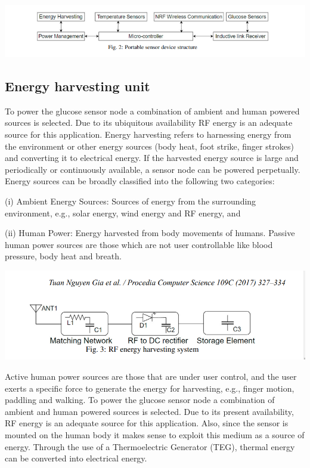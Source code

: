 \documentclass{article}
\begin{document}
\begin{center}
  \includegraphics[scale=0.5]{sensor.png}
  \label{fig:sen}
\end{center}

\subsection{Energy harvesting unit}
To power the glucose sensor node a combination of ambient and human powered sources is selected. Due to its ubiquitous availability RF energy is an adequate source for this application.
Energy harvesting refers to harnessing energy from the environment or other energy sources (body heat, foot strike, finger strokes) and converting it to electrical energy. If the harvested energy source is large and periodically or continuously available, a sensor node can be powered perpetually. Energy sources can be broadly classified into the following two categories:

(i) Ambient Energy Sources: Sources of energy from the surrounding environment, e.g., solar energy, wind energy and RF energy, and 

(ii) Human Power: Energy harvested from body movements of humans. Passive human power sources are those which are not user controllable like blood pressure, body heat and breath. 


\begin{center}
  \includegraphics[scale=0.5]{rf.png}
  \label{fig:rf}
\end{center}

Active human power sources are those that are under user control, and the user exerts a specific force to generate the energy for harvesting, e.g., finger motion, paddling and walking. To power the glucose sensor node a combination of ambient and human powered sources is selected. Due to its present availability, RF energy is an adequate source for this application. Also, since the sensor is mounted on the human body it makes sense to exploit this medium as a source of energy. Through the use of a Thermoelectric Generator (TEG), thermal energy can be converted into electrical energy. 
\end{document}
